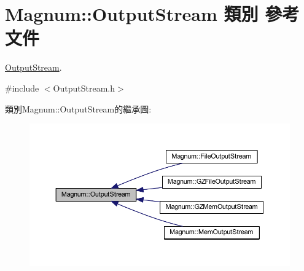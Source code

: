 \hypertarget{class_magnum_1_1_output_stream}{}\section{Magnum\+:\+:Output\+Stream 類別 參考文件}
\label{class_magnum_1_1_output_stream}


\hyperlink{class_magnum_1_1_output_stream}{Output\+Stream}.  




{\ttfamily \#include $<$Output\+Stream.\+h$>$}



類別\+Magnum\+:\+:Output\+Stream的繼承圖\+:\nopagebreak
\begin{figure}[H]
\begin{center}
\leavevmode
\includegraphics[width=350pt]{class_magnum_1_1_output_stream__inherit__graph}
\end{center}
\end{figure}
